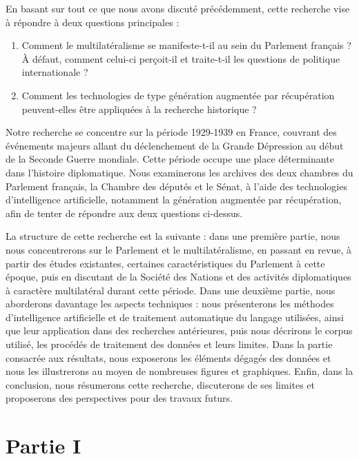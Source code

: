 \documentclass[a4paper,twoside,12pt]{book}
\begin{document}
En basant sur tout ce que nous avons discuté précédemment, cette recherche vise à répondre à deux questions principales :
\begin{enumerate}
    \item Comment le multilatéralisme se manifeste-t-il au sein du Parlement français ? À défaut, comment celui-ci perçoit-il et traite-t-il les questions de politique internationale ?
    \item Comment les technologies de type génération augmentée par récupération peuvent-elles être appliquées à la recherche historique ?
\end{enumerate}

Notre recherche se concentre sur la période 1929-1939 en France, couvrant des événements majeurs allant du déclenchement de la Grande Dépression au début de la Seconde Guerre mondiale. Cette période occupe une place déterminante dans l'histoire diplomatique. Nous examinerons les archives des deux chambres du Parlement français, la Chambre des députés et le Sénat, à l'aide des technologies d'intelligence artificielle, notamment la génération augmentée par récupération, afin de tenter de répondre aux deux questions ci-dessus.  

La structure de cette recherche est la suivante : dans une première partie, nous nous concentrerons sur le Parlement et le multilatéralisme, en passant en revue, à partir des études existantes, certaines caractéristiques du Parlement à cette époque, puis en discutant de la Société des Nations et des activités diplomatiques à caractère multilatéral durant cette période. Dans une deuxième partie, nous aborderons davantage les aspects techniques : nous présenterons les méthodes d'intelligence artificielle et de traitement automatique du langage utilisées, ainsi que leur application dans des recherches antérieures, puis nous décrirons le corpus utilisé, les procédés de traitement des données et leurs limites. Dans la partie consacrée aux résultats, nous exposerons les éléments dégagés des données et nous les illustrerons au moyen de nombreuses figures et graphiques. Enfin, dans la conclusion, nous résumerons cette recherche, discuterons de ses limites et proposerons des perspectives pour des travaux futurs.


\chapter{Partie I}
\end{document}
